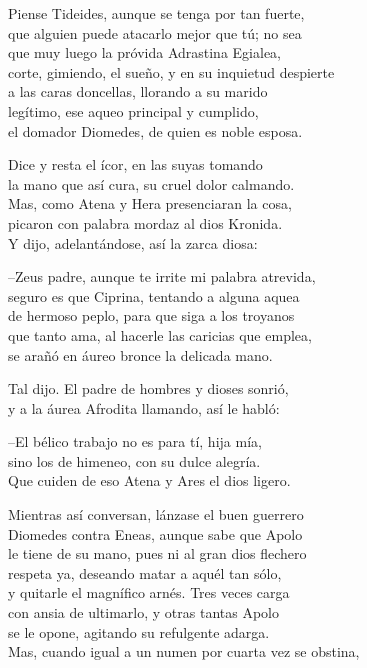 Piense Tideides, aunque se tenga por tan fuerte,\\
que alguien puede atacarlo mejor que tú; no sea\\
que muy luego la próvida Adrastina Egialea,\\
corte, gimiendo, el sueño, y en su inquietud despierte\\
a las caras doncellas, llorando a su marido\\
legítimo, ese aqueo principal y cumplido,\\
el domador Diomedes, de quien es noble esposa.\par
Dice y resta el ícor, en las suyas tomando\\
la mano que así cura, su cruel dolor calmando.\\
Mas, como Atena y Hera presenciaran la cosa,\\
picaron con palabra mordaz al dios Kronida.\\
Y dijo, adelantándose, así la zarca diosa:\par
--Zeus padre, aunque te irrite mi palabra atrevida,\\
seguro es que Ciprina, tentando a alguna aquea\\
de hermoso peplo, para que siga a los troyanos\\
que tanto ama, al hacerle las caricias que emplea,\\
se arañó en áureo bronce la delicada mano.\par
Tal dijo. El padre de hombres y dioses sonrió,\\
y a la áurea Afrodita llamando, así le habló:\par
--El bélico trabajo no es para tí, hija mía,\\
sino los de himeneo, con su dulce alegría.\\
Que cuiden de eso Atena y Ares el dios ligero.\par
Mientras así conversan, lánzase el buen guerrero\\
Diomedes contra Eneas, aunque sabe que Apolo\\
le tiene de su mano, pues ni al gran dios flechero\\
respeta ya, deseando matar a aquél tan sólo,\\
y quitarle el magnífico arnés. Tres veces carga\\
con ansia de ultimarlo, y otras tantas Apolo\\
se le opone, agitando su refulgente adarga.\\
Mas, cuando igual a un numen por cuarta vez se obstina,\\
